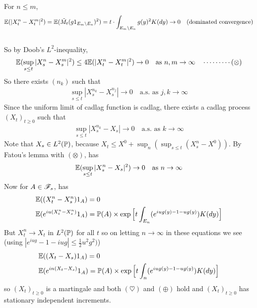 \documentclass[12pt,a4paper]{report}
\newenvironment{proof}
{\begin{changemargin}{1cm}{0.5cm} 
	}%
	{\end{changemargin}
}
\begin{document}
\begin{proof}
\pf For $n\leq m$,
\begin{align*}
\mathbb{E}( |X^n_t - X^m_t|^2) = \mathbb{E}( \tilde{M}_t(g1_{E_m \backslash E_n})^2) =  t\cdot \int_{E_m \backslash E_n} g(y)^2 K(dy) \rightarrow 0 \quad \text{(dominated convergence)}
\end{align*}\\
So by Doob's $L^2$-inequality,
\begin{align*}
\mathbb{E}(\sup_{s\leq t} |X_s^n - X_s^m|^2) \leq 4\mathbb{E}(|X_t^n - X_t^m|^2) \rightarrow 0 \quad \text{as } n,m\rightarrow \infty \quad \cdots\cdots\cdots (\otimes)
\end{align*}
So there exists $(n_k)$ such that
\begin{align*}
\sup_{s \leq t} |X_s^{n_k} - X_s^{n_j}| \rightarrow 0 \quad \text{a.s. as } j,k\rightarrow \infty 
\end{align*}
Since the uniform limit of cadlag function is cadlag, there exists a cadlag process $(X_t)_{t\geq 0}$ such that
\begin{align*}
\sup_{s\leq t} |X_s^{n_k} - X_s| \rightarrow 0 \quad \text{a.s. as } k \rightarrow \infty
\end{align*}
Note that $X_s \in L^2(\mathbb{P})$, because $X_t \leq X^0 + \sup_{n}(\sup_{s\leq t} (X_s^n - X^0))$. By Fatou's lemma with $(\otimes)$, has
\begin{align*}
\mathbb{E}(\sup_{s\leq t} |X_s^n - X_s|^2 ) \rightarrow 0 \quad \text{as } n\rightarrow \infty
\end{align*}
Now for $A \in \mathscr{F}_s$, has
\begin{align*}
& \mathbb{E}( (X_t^n - X_s^n) 1_A ) =0 \\
& \mathbb{E}(e^{iu (X_t^n - X_s^n)} 1_A) = \mathbb{P}(A) \times \exp \Big[ t\int_{E_n} (e^{iug(y)-1-ug(y)}) K(dy) \Big]
\end{align*}
But $X_t^n \rightarrow X_t$ in $L^2(\mathbb{P})$ for all $t$ so on letting $n\rightarrow \infty$ in these equations we see (using $|e^{iug}-1-iug| \leq \frac{1}{2}u^2 g^2)$)
\begin{align*}
& \mathbb{E}( (X_t - X_s) 1_A ) =0 \\
& \mathbb{E}(e^{in (X_t - X_s)} 1_A) = \mathbb{P}(A) \times \exp \Big[ t\int_{n} (e^{iug(y)-1-ug(y)}) K(dy) \Big]
\end{align*}
so $(X_t)_{t\geq 0}$ is a martingale and both $(\heartsuit)$ and $(\oplus)$ hold and $(X_t)_{t\geq 0}$ has stationary independent increments.\\

\eop
\end{proof}
\end{document}
